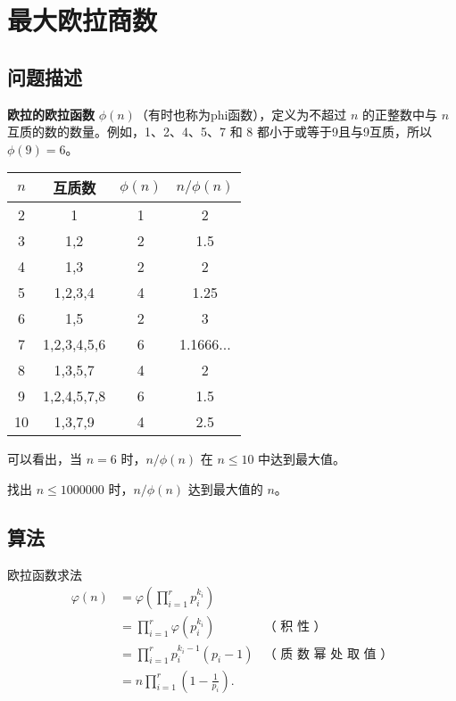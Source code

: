 \section{最大欧拉商数}\label{sec:problem69}
\subsection{问题描述}
\begin{tcolorbox}
	\textbf{欧拉的欧拉函数} \(\phi(n)\)（有时也称为phi函数），定义为不超过 \(n\) 的正整数中与 \(n\) 互质的数的数量。例如，1、2、4、5、7 和 8 都小于或等于9且与9互质，所以 \(\phi(9)=6\)。

	\begin{center}
		\begin{tabular}{|c|c|c|c|}
			\hline
			\(n\) & 互质数      & \(\phi(n)\) & \(n/\phi(n)\) \\
			\hline
			2     & 1           & 1           & 2             \\
			3     & 1,2         & 2           & 1.5           \\
			4     & 1,3         & 2           & 2             \\
			5     & 1,2,3,4     & 4           & 1.25          \\
			6     & 1,5         & 2           & 3             \\
			7     & 1,2,3,4,5,6 & 6           & 1.1666...     \\
			8     & 1,3,5,7     & 4           & 2             \\
			9     & 1,2,4,5,7,8 & 6           & 1.5           \\
			10    & 1,3,7,9     & 4           & 2.5           \\
			\hline
		\end{tabular}
	\end{center}

	可以看出，当 \(n=6\) 时，\(n/\phi(n)\) 在 \(n \leq 10\) 中达到最大值。

	找出 \(n \leq \num{1000000}\) 时，\(n/\phi(n)\) 达到最大值的 \(n\)。
\end{tcolorbox}

\subsection{算法}
欧拉函数求法
\begin{align*}
	\varphi (n) & =\varphi \left(\prod _{i=1}^{r}p_{i}^{k_{i}}\right)  \\
	            & =\prod _{i=1}^{r}\varphi \left(p_{i}^{k_{i}}\right)
	            & {\text{（ 积 性 ）}}                                 \\
	            & =\prod _{i=1}^{r}p_{i}^{k_{i}-1}(p_{i}-1)
	            & {\text{（ 质 数 幂 处 取 值 ）}}                     \\
	            & =n\prod _{i=1}^{r}\left(1-{\frac {1}{p_{i}}}\right).
\end{align*}

